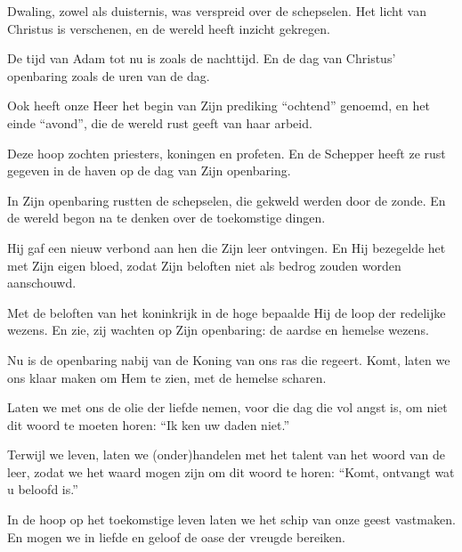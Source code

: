 \documentclass[12pt,twoside,a5paper]{article}
\begin{document}


\begin{halfparskip}
  Dwaling, zowel als duisternis, was verspreid over de schepselen. Het licht van Christus is verschenen, en de wereld heeft inzicht gekregen.

  De tijd van Adam tot nu is zoals de nachttijd. En de dag van Christus' openbaring zoals de uren van de dag.

  Ook heeft onze Heer het begin van Zijn prediking ``ochtend'' genoemd, en het einde ``avond'', die de wereld rust geeft van haar arbeid.

  Deze hoop zochten priesters, koningen en profeten. En de Schepper heeft ze rust gegeven in de haven op de dag van Zijn openbaring.

  In Zijn openbaring rustten de schepselen, die gekweld werden door de zonde. En de wereld begon na te denken over de toekomstige dingen.

  Hij gaf een nieuw verbond aan hen die Zijn leer ontvingen. En Hij bezegelde het met Zijn eigen bloed, zodat Zijn beloften niet als bedrog zouden worden aanschouwd.

  Met de beloften van het koninkrijk in de hoge bepaalde Hij de loop der redelijke wezens. En zie, zij wachten op Zijn openbaring: de aardse en hemelse wezens.

  Nu is de openbaring nabij van de Koning van ons ras die regeert. Komt, laten we ons klaar maken om Hem te zien, met de hemelse scharen.

  Laten we met ons de olie der liefde nemen, voor die dag die vol angst is, om niet dit woord te moeten horen: ``Ik ken uw daden niet.''

  Terwijl we leven, laten we (onder)handelen met het talent van het woord van de leer, zodat we het waard mogen zijn om dit woord te horen: ``Komt, ontvangt wat u beloofd is.''

  In de hoop op het toekomstige leven laten we het schip van onze geest vastmaken. En mogen we in liefde en geloof de oase der vreugde bereiken.
\end{halfparskip}
\end{document}
